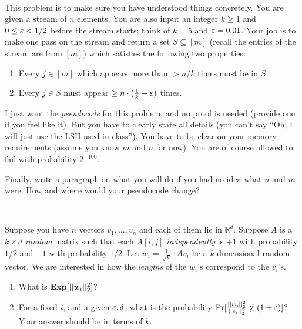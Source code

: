 \documentclass[11pt]{article}
\begin{document}
\vspace{1ex}
\begin{exercise}\Coffeecup \Coffeecup~
	
	This problem is to make sure you have understood things concretely.
	You are given a stream of $n$ elements. You are also input an integer $k \ge 1$ and $0 \leq \varepsilon < 1/2$ before the stream starts; think of $k = 5$ and $\varepsilon = 0.01$. Your job is to make one pass on the stream and return a set $S\subseteq [m]$ (recall the entries of the stream are from $[m]$) which satisfies the following two properties:
	\begin{enumerate}
		\item Every $j\in [m]$ which appears more than $> n/k$ times must be in $S$.
		\item Every $j\in S$ must appear $\geq n\cdot (\frac{1}{k} - \varepsilon)$ times.
	\end{enumerate}
	I just want the {\em pseudocode} for this problem, and no proof is needed (provide one if you feel like it). 
	But you have to clearly state all details (you can't say ``Oh, I will just use the LSH used in class''). You have to be clear on your memory requirements (assume you know $m$ and $n$ for now). You are of course allowed to fail with probability $2^{-100}$. 
	
	Finally, write a paragraph on what you will do if you had no idea what $n$ and $m$ were. How and where would your pseudocode change?
\end{exercise}

\vspace{1ex}
\begin{exercise}\Coffeecup {}~
	
	Suppose you have $n$ vectors $v_1,\ldots,v_n$ and each of them lie in $\mathbb{R}^d$.
	Suppose $A$ is a $k\times d$ {\em random} matrix such that each $A[i,j]$ {\em independently} is $+1$ with probability $1/2$ and $-1$ with probability $1/2$. Let $w_i = \frac{1}{\sqrt{k}} \cdot Av_i$ be a $k$-dimensional random vector. We are interested in how the {\em lengths} of the $w_i$'s correspond to the $v_i$'s.
	
	\begin{enumerate}
		\item What is $\mathbf{Exp}[||w_i||^2_2]$?
		\item For a fixed $i$, and a given $\varepsilon,\delta$, what is the probability 
		$\Pr[\frac{||w_i||^2_2}{||v_i||^2_2} \notin (1 \pm \varepsilon)]$?  Your answer should be in terms of $k$.
	\end{enumerate}
\end{exercise}
\end{document}
